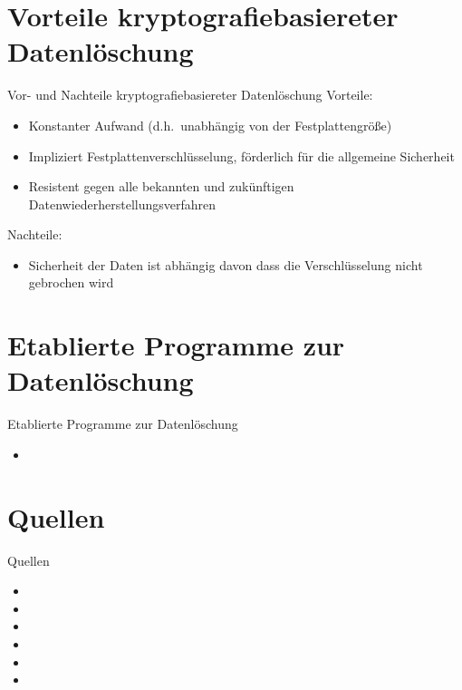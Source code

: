 \documentclass{beamer}
\begin{document}
\section{Vorteile kryptografiebasiereter Datenlöschung}
\begin{frame}{Vor- und Nachteile kryptografiebasiereter Datenlöschung}
	\large{Vorteile:}
	\begin{itemize}
		\item Konstanter Aufwand (d.h.\ unabhängig von der Festplattengröße)
		\item Impliziert Festplattenverschlüsselung, förderlich für die
			allgemeine Sicherheit
		\item Resistent gegen alle bekannten und zukünftigen
			Datenwiederherstellungsverfahren
	\end{itemize}

	\large{Nachteile:}
	
	\begin{itemize}
		\item Sicherheit der Daten ist abhängig davon dass die Verschlüsselung
			nicht gebrochen wird
	\end{itemize}
\end{frame}

\section{Etablierte Programme zur Datenlöschung}
\begin{frame}{Etablierte Programme zur Datenlöschung}
	\begin{itemize}
		\item
	\end{itemize}
\end{frame}

\section{Quellen}
\begin{frame}{Quellen}
	\begin{itemize}
		\item %
		\item %
		\item %
		\item %
		\item %
		\item %
	\end{itemize}
\end{frame}
\end{document}

